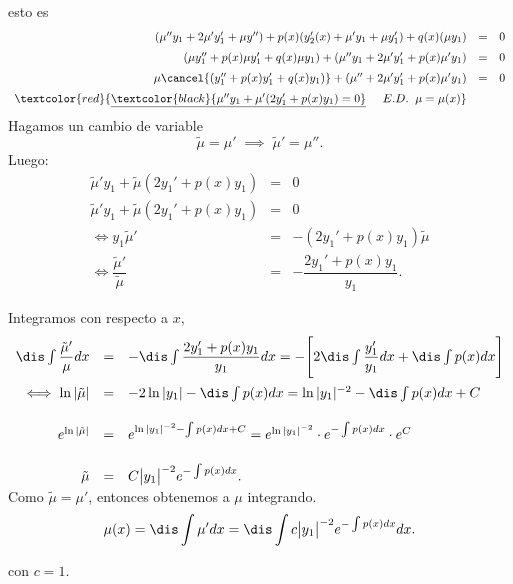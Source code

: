 \documentclass{beamer}
\begin{document}
\begin{frame}[t]
	\begin{block}{}
		esto es
		\footnotesize 
		\[
			\begin{array}{rcl}
				(\mu '' y_1+2 \mu 'y_1' + \mu y'') +p(x) (y'_2 (x) + \mu ' y_1+ \mu y_1') +q(x) (\mu y_1) & = & 0 \\[2mm]
				(\mu y_1'' +p(x) \mu y_1' +q(x) \mu y_1) + (\mu '' y_1+2 \mu 'y_1' +p(x) \mu ' y_1) & = & 0 \\[2mm]
				\mu \cancel{(y_1'' +p(x) y_1' +q(x) y_1)} + (\mu '' +2 \mu 'y_1' +p(x) \mu ' y_1) & = & 0 \\[2mm]
				\textcolor{red}{ \underline{\textcolor{black}{\mu '' y_1+ \mu ' (2y_1' +p(x) y_1) =0}} \hspace{5mm} E.D. \;\; \mu = \mu (x)} &&
			\end{array}
		\]
		Hagamos un cambio de variable
		\[
			\tilde{\mu} = \mu ' \;\implies\; \tilde{\mu} ' = \mu ''.
		\]
		Luego:
		\[
			\begin{array}{rcl}
				\tilde{\mu} ' y_1 + \tilde{\mu} (2y_1' +p(x) y_1) & = & 0 \\[2mm]
				\tilde{\mu} ' y_1+ \tilde{\mu} (2y_1' +p(x) y_1) & = & 0 \\[2mm]
				\iff y_1 \tilde{\mu} ' & = & -(2y_1' +p(x) y_1) \tilde{\mu} \\[2mm]
				\iff \dfrac{\tilde{\mu} '}{\tilde{\mu}} & = & - \dfrac{2y_1' +p(x) y_1}{y_1}.
			\end{array}
		\]
	\end{block}
\end{frame}

\begin{frame}[t]
	\begin{block}{}
		Integramos con respecto a \(x\),
		\small
		\[
			\begin{array}{rcl}
				\dis\int \dfrac{\tilde{\mu} '}{\mu} dx & = & - \dis\int \dfrac{2y_1' +p(x) y_1}{y_1} dx = - \Bigg[2 \dis\int \dfrac{y_1'}{y_1} dx + \dis\int p(x) dx\Bigg] \\[5mm]
				\iff \ln | \tilde{\mu} | & = & -2 \ln |y_1| - \dis\int p(x) dx = \ln |y_1|^{-2} - \dis\int p(x) dx+C \\[5mm]
				e^{\ln | \tilde{\mu} |} & = & e^{\ln |y_1|^{-2} - \int p(x) dx +C} = e^{\ln |y_1|^{-2}} \cdot e^{-\int p(x) dx} \cdot e^C \\[5mm]
				\tilde{\mu} & = & C \big| y_1 \big| ^{-2} e^{-\int p(x) dx} . \vspace{-2mm}
			\end{array}
		\]
		Como \(\tilde{\mu} = \mu '\), entonces obtenemos a \(\mu\) integrando. \vspace{-2mm} 
		\[
			\mu (x) = \dis\int \mu ' dx = \dis\int c \big| y_1 \big| ^{-2} e^{-\int p(x) dx} dx.
		\]
		\begin{center}
			\color{red}  \hspace{2mm} con \(c=1\).
		\end{center} 
	\end{block}
\end{frame}
\end{document}

